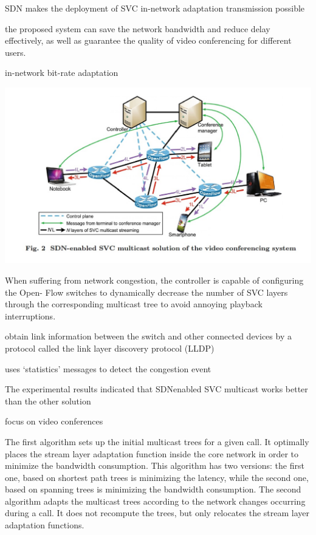\documentclass[a4paper, 10pt, conference]{ieeeconf}
\begin{document}
SDN makes the deployment
of SVC in-network adaptation transmission possible

the proposed system can save the network bandwidth
and reduce delay effectively, as well as guarantee the
quality of video conferencing for different users.

in-network bit-rate adaptation

\includegraphics[width=\textwidth]{svc-sdn-video-conf.jpg}

When suffering from network congestion,
the controller is capable of configuring the Open-
Flow switches to dynamically decrease the number of
SVC layers through the corresponding multicast tree
to avoid annoying playback interruptions.

obtain link information between the switch and other connected devices
by a protocol called the link layer discovery protocol (LLDP)

uses ‘statistics’ messages to detect the
congestion event

The experimental results indicated that SDNenabled
SVC multicast works better than the
other solution


\cite{al2018adaptive}
focus on video conferences

The first algorithm sets up the initial multicast
trees for a given call. It optimally places the stream layer adaptation function inside the core network in order
to minimize the bandwidth consumption. This algorithm has two versions: the first one, based on shortest path
trees is minimizing the latency, while the second one, based on spanning trees is minimizing the bandwidth
consumption. The second algorithm adapts the multicast trees according to the network changes occurring during
a call. It does not recompute the trees, but only relocates the stream layer adaptation functions.
\end{document}
